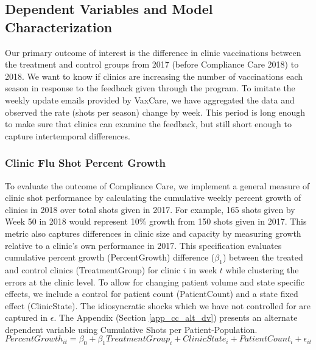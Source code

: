  \subsection{Dependent Variables and Model Characterization}
 Our primary outcome of interest is the difference in clinic vaccinations between the treatment and control groups from 2017 (before Compliance Care 2018) to 2018. We want to know if clinics are increasing the number of vaccinations each season in response to the feedback given through the program. To imitate the weekly update emails provided by VaxCare, we have aggregated the data and observed the rate (shots per season) change by week. This period is long enough to make sure that clinics can examine the feedback, but still short enough to capture intertemporal differences. 
 
 \subsubsection{Clinic Flu Shot Percent Growth} \label{emp_spec_pctGrowth}
 To evaluate the outcome of Compliance Care, we implement a general measure of clinic shot performance by calculating the cumulative weekly percent growth of clinics in 2018 over total shots given in 2017. For example, 165 shots given by Week 50 in 2018 would represent 10\% growth from 150 shots given in 2017. This metric also captures differences in clinic size and capacity by measuring growth relative to a clinic’s own performance in 2017. This specification evaluates cumulative percent growth (PercentGrowth) difference ($\beta_1$) between the treated and control clinics (TreatmentGroup) for clinic $i$ in week $t$ while clustering the errors at the clinic level. To allow for changing patient volume and state specific effects, we include a control for patient count (PatientCount) and a state fixed effect (ClinicState). The idiosyncratic shocks which we have not controlled for are captured in $\epsilon$. The Appendix (Section \ref{app_cc_alt_dv}) presents an alternate dependent variable using Cumulative Shots per Patient-Population.
  \begin{equation} %
       PercentGrowth_{it} = \beta_0 + \beta_1 TreatmentGroup_i + ClinicState_i + PatientCount_i + \epsilon_{it} 
  \end{equation}
 
